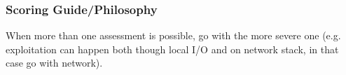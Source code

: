 \documentclass[a4paper, 10pt, titlepage]{article}
\begin{document}
\subsubsection*{Scoring Guide/Philosophy}
When more than one assessment is possible, go with the more severe one (e.g. exploitation can happen both though local I/O and on network stack, in that case go with network).
\end{document}
